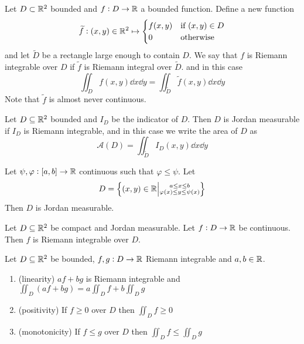 \documentclass[12pt]{extarticle}
\begin{document}
\begin{definition}
    Let $D\subset \mathbb{R}^2$ bounded and $f:D \to \mathbb{R}$ a bounded function.
    Define a new function
    \begin{equation}
        \widetilde{f} : (x, y) \in \mathbb{R}^2 \mapsto \begin{cases}
            f(x, y) & \text{if } (x, y) \in D \\
            0       & \text{otherwise}
        \end{cases}
    \end{equation}
    and let $\widetilde{D}$ be a rectangle large enough to contain $D$.
    We say that $f$ is Riemann integrable over $D$ if $\widetilde{f}$ is Riemann integral over $\widetilde{D}$. and in this case
    \begin{equation}
        \iint_D f(x, y) \dd{x} \dd{y} = \iint_{\widetilde{D}} \widetilde{f}(x, y)\dd{x}\dd{y}
    \end{equation}
    Note that $\widetilde{f}$ is almost never continuous.
\end{definition}

\begin{definition}
    Let $D \subseteq \mathbb{R}^2$ bounded and $I_D$ be the indicator of $D$.
    Then $D$ is Jordan measurable if $I_D$ is Riemann integrable, and in this case we write the area of $D$ as
    \begin{equation}
        \mathcal A(D) = \iint_{\widetilde{D}} I_D(x, y) \dd{x} \dd{y}
    \end{equation}
\end{definition}

\begin{proposition}
    Let $\psi, \varphi: [a, b] \to \mathbb{R}$ continuous such that $\varphi \leq \psi$.
    Let
    \begin{equation}
        D = \left\{(x, y) \in \mathbb{R} \middle| \substack{a \leq x \leq b \\ \varphi(x) \leq y \leq \psi(x)}\right\}
    \end{equation}
    Then $D$ is Jordan measurable.
\end{proposition}

\begin{theorem}
    Let $D \subseteq \mathbb{R}^2$ be compact and Jordan measurable.
    Let $f: D \to \mathbb{R}$ be continuous.
    Then $f$ is Riemann integrable over $D$.
\end{theorem}

\begin{proposition}
    Let $D \subseteq \mathbb{R}^2$ be bounded, $f, g : D \to \mathbb{R}$ Riemann integrable and $a, b \in \mathbb{R}$.
    \begin{enumerate}[label=\roman*.]
        \item (linearity) $af + bg$ is Riemann integrable and
              $\iint_D (af + bg) = a \iint_D f + b \iint_D g$
        \item (positivity) If $f \geq 0$ over $D$ then $\iint_D f \geq 0$
        \item (monotonicity) If $f \leq g$ over $D$ then $\iint_D f \leq \iint_D g$
    \end{enumerate}
\end{proposition}
\end{document}
